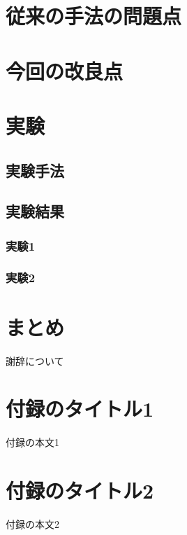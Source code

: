 \documentclass[originalpaper]{jpnsecart}      %
\begin{document}
\section{従来の手法の問題点}
\section{今回の改良点}
\section{実験}
\subsection{実験手法}
\subsection{実験結果}
\subsubsection{実験1}
\subsubsection{実験2}
\section{まとめ}

\begin{acknowledgment}
謝辞について
\end{acknowledgment}




\appendix

\section{付録のタイトル1}

付録の本文1

\section{付録のタイトル2}

付録の本文2

\begin{biography}
\end{biography}
\end{document}
